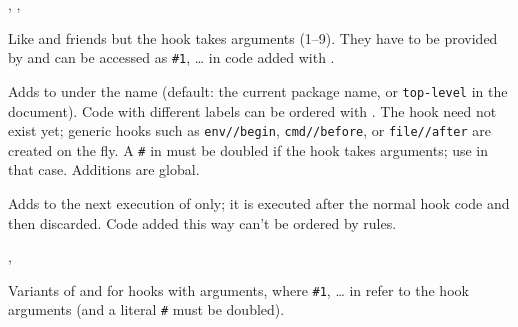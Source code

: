 \documentclass{l3in2edoc}
\begin{document}
\begin{function}[]
  {
    \NewHookWithArguments,
    \NewReversedHookWithArguments,
    \NewMirroredHookPairWithArguments
  }
  \begin{syntax}
      
  \end{syntax}
  Like  and friends but the hook takes 
  arguments (1--9). They have to be provided by
   and can be accessed as \texttt{\#1},
  \ldots{} in code added with .
\end{function}



\begin{function}[user]
  {
    \AddToHook
  }
  \begin{syntax}
       
  \end{syntax}
  Adds  to  under the name 
  (default: the current package name, or \texttt{top-level} in the
  document). Code with different labels can be ordered with
  . The hook need not exist yet; generic hooks
  such as \texttt{env//begin}, \texttt{cmd//before}, or
  \texttt{file//after} are created on the fly. A \texttt{\#}
  in  must be doubled if the hook takes arguments; use
   in that case. Additions are global.
\end{function}



\begin{function}[user]
  {
    \AddToHookNext
  }
  \begin{syntax}
      
  \end{syntax}
  Adds  to the next execution of  only; it is
  executed after the normal hook code and then discarded. Code added
  this way can't be ordered by rules.
\end{function}



\begin{function}[user]
  {
    \AddToHookWithArguments,
    \AddToHookNextWithArguments
  }
  \begin{syntax}
       
      
  \end{syntax}
  Variants of  and  for hooks with
  arguments, where \texttt{\#1}, \ldots{} in  refer to the
  hook arguments (and a literal \texttt{\#} must be doubled).
\end{function}
\end{document}
